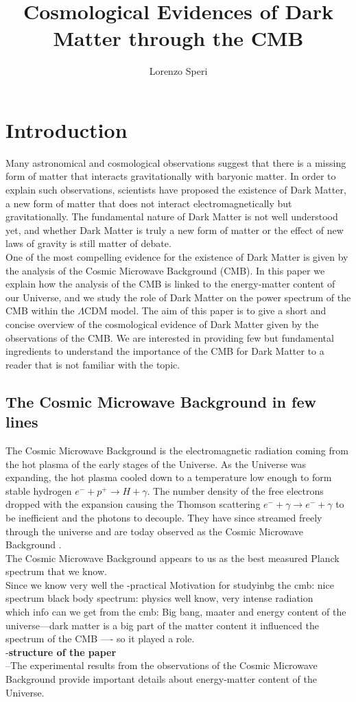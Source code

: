 \documentclass{article}
\title{Cosmological Evidences of Dark Matter through the CMB}
\author{Lorenzo Speri}
\date{}
\begin{document}
\maketitle


\section{Introduction}
Many astronomical and cosmological observations suggest that there is a missing form of matter that interacts gravitationally with baryonic matter. 
In order to explain such observations, scientists have proposed the existence of Dark Matter, a new form of matter that does not interact electromagnetically but gravitationally.
The fundamental nature of Dark Matter is not well understood yet, and whether Dark Matter is truly a new form of matter or the effect of new laws of gravity is still matter of debate.\\
One of the most compelling evidence for the existence of Dark Matter is given by the analysis of the Cosmic Microwave Background (CMB).
In this paper we explain how the analysis of the CMB is linked to the energy-matter content of our Universe, and we study the role of Dark Matter on the power spectrum of the CMB within the $\Lambda$CDM model.
The aim of this paper is to give a short and concise overview of the cosmological evidence of Dark Matter given by the observations of the CMB.
We are interested in providing few but fundamental ingredients to understand the importance of the CMB for Dark Matter to a reader that is not familiar with the topic.
\\
 

\subsection{The Cosmic Microwave Background in few lines}
The Cosmic Microwave Background is the electromagnetic radiation coming from the hot plasma of the early stages of the Universe.
As the Universe was expanding, the hot plasma cooled down to a temperature low enough to form stable hydrogen $e^- + p^+  \rightarrow H + \gamma$. The number density of the free electrons dropped with the expansion causing the Thomson scattering $e^- + \gamma  \rightarrow e^- + \gamma$ to be inefficient and the photons to decouple. They have since streamed freely through the universe and are today observed as the Cosmic Microwave Background \citep{LecturesPdf}.\\
The Cosmic Microwave Background appears to us as the best measured Planck spectrum that we know.\\
Since we know very well the 
-practical Motivation for studyinbg the cmb: nice spectrum black body spectrum: physics well know, very intense radiation\\
which info can we get from the cmb: Big bang, maater and energy content of the universe---dark matter is a big part of the matter content it influenced the spectrum  of the CMB ---- so it played a role.\\
-\textbf{structure of the paper} \\
--The experimental results from the observations of the Cosmic Microwave Background provide important details about energy-matter content of the Universe.\\
\end{document}
